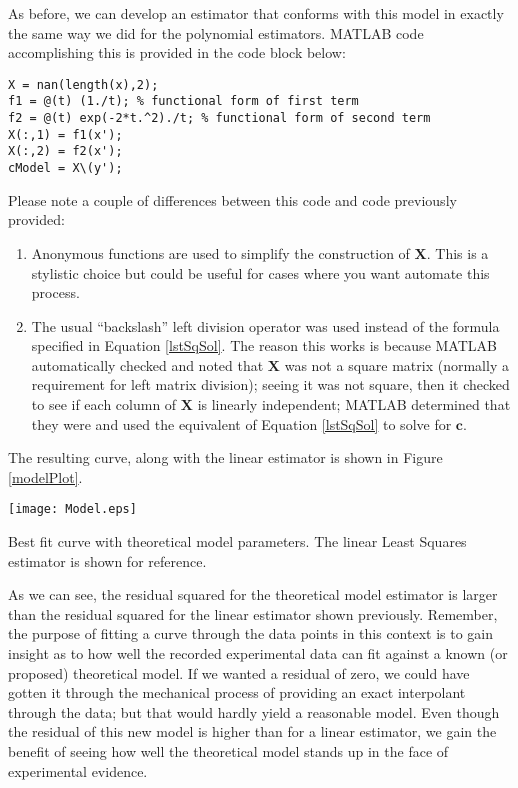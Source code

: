 As before, we can develop an estimator that conforms with this model in exactly the same way we did for the polynomial estimators.  MATLAB code accomplishing this is provided in the code block below:

\begin{lstlisting}[style=myMatlab]
X = nan(length(x),2);
f1 = @(t) (1./t); % functional form of first term
f2 = @(t) exp(-2*t.^2)./t; % functional form of second term
X(:,1) = f1(x');
X(:,2) = f2(x');
cModel = X\(y');
\end{lstlisting}

Please note a couple of differences between this code and code previously provided:

\begin{enumerate}%
\item Anonymous functions are used to simplify the construction of
  $\mathbf{X}$.  This is a stylistic choice but could be useful for
  cases where you want automate this process.
\item The usual ``backslash'' left division operator was used instead of the formula specified in Equation \ref{lstSqSol}.  The reason this works is because
  MATLAB automatically checked and noted that $\mathbf{X}$ was not a square
  matrix (normally a requirement for left matrix division); seeing it was
  not square, then it checked to see if each column of $\mathbf{X}$ is
  linearly independent; MATLAB determined that they were and used the equivalent of
  Equation \ref{lstSqSol} to solve for $\mathbf{c}$.  
\end{enumerate}

The resulting curve, along with the linear estimator is shown in Figure \ref{modelPlot}.


\begin{marginfigure}[-2.0cm]
\texttt{[image: Model.eps]}
\caption{Best fit curve with theoretical model parameters.  The linear Least
  Squares estimator is shown for reference.}
\label{modelPlot}
\end{marginfigure}  


As we can see, the residual squared for the theoretical model estimator is larger
than the residual squared for the linear estimator shown previously.
Remember, the purpose of fitting a curve through the data points in this
context is to gain insight as to how well the recorded experimental data can
fit against a known (or proposed) theoretical model.  If we wanted a residual of zero, we could have gotten it through the mechanical process of providing an exact interpolant through the data; but that would hardly yield a reasonable model.  Even though the residual
of this new model is higher than for a linear estimator, we gain the benefit
of seeing how well the theoretical model stands up in the face of experimental
evidence.  

